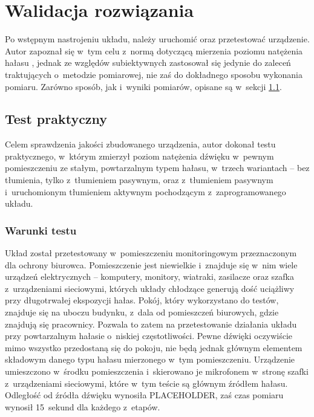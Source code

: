 \chapter{Walidacja rozwiązania}
\label{cha:tests}
Po wstępnym nastrojeniu układu, należy uruchomić oraz przetestować urządzenie. Autor zapoznał się w~tym celu z~normą dotyczącą mierzenia poziomu natężenia hałasu \cite{test_norm}, jednak ze względów subiektywnych zastosował się jedynie do zaleceń traktujących o~metodzie pomiarowej, nie zaś do dokładnego sposobu wykonania pomiaru. Zarówno sposób, jak i~wyniki pomiarów, opisane są w~sekcji \ref{sec:practical_test}.
\section{Test praktyczny}
\label{sec:practical_test}
Celem sprawdzenia jakości zbudowanego urządzenia, autor dokonał testu praktycznego, w~którym zmierzył poziom natężenia dźwięku w~pewnym pomieszczeniu ze stałym, powtarzalnym typem hałasu, w~trzech wariantach -- bez tłumienia, tylko z~tłumieniem pasywnym, oraz z~tłumieniem pasywnym i~uruchomionym tłumieniem aktywnym pochodzącym z~zaprogramowanego układu.
\subsection{Warunki testu}
\label{subsec:circumstances}
Układ został przetestowany w~pomieszczeniu monitoringowym przeznaczonym dla ochrony biurowca. Pomieszczenie jest niewielkie i~znajduje się w~nim wiele urządzeń elektrycznych -- komputery, monitory, wiatraki, zasilacze oraz szafka z~urządzeniami sieciowymi, których układy chłodzące generują dość uciążliwy przy długotrwałej ekspozycji hałas. Pokój, który wykorzystano do testów, znajduje się na uboczu budynku, z~dala od pomieszczeń biurowych, gdzie znajdują się pracownicy. Pozwala to zatem na przetestowanie działania układu przy powtarzalnym hałasie o~niskiej częstotliwości. Pewne dźwięki oczywiście mimo wszystko przedostaną się do pokoju, nie będą jednak głównym elementem składowym danego typu hałasu mierzonego w~tym pomieszczeniu. Urządzenie umieszczono w~środku pomieszczenia i~skierowano je mikrofonem w~stronę szafki z~urządzeniami sieciowymi, które w~tym teście są głównym źródłem hałasu. Odległość od źródła dźwięku wynosiła PLACEHOLDER, %
zaś czas pomiaru wynosił 15~sekund dla każdego z~etapów.
